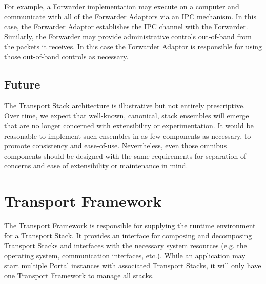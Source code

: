 For example, a Forwarder implementation may execute on a computer and communicate with all of the Forwarder Adaptors via an IPC mechanism.
In this case, the Forwarder Adaptor establishes the IPC channel with the Forwarder.
Similarly, the Forwarder may provide administrative controls out-of-band from the packets it receives. In this case the Forwarder Adaptor is responsible for using those out-of-band controls as necessary.

\subsection{Future}
The Transport Stack architecture is illustrative but not entirely prescriptive.
Over time, we expect that well-known, canonical, stack ensembles will emerge
that are no longer concerned with extensibility or experimentation.
It would be reasonable to implement such ensembles in as few components as necessary, to promote consistency and ease-of-use.
Nevertheless, even those omnibus components should be designed with the same requirements for separation of concerns and ease of extensibility or maintenance in mind.

\section{Transport Framework}
The Transport Framework is responsible for supplying the runtime environment for a Transport Stack.
It provides an interface for composing and decomposing Transport Stacks and interfaces with the 
necessary system resources (e.g. the operating system, communication interfaces, etc.). While an application
may start multiple Portal instances with associated Transport Stacks, it will only have one Transport Framework
to manage all stacks.

